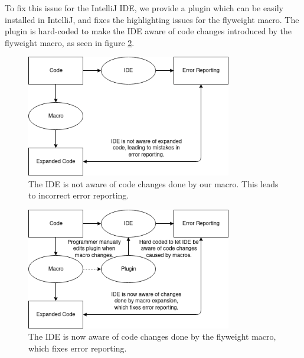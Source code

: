 \documentclass[11pt]{article}
\begin{document}
    To fix this issue for the IntelliJ IDE,
    we provide a plugin which
    can be easily installed in IntelliJ, and fixes the highlighting
    issues for the flyweight macro. The plugin is hard-coded to
    make the IDE aware of code changes introduced by the flyweight
    macro, as seen in figure \ref{fig:ide-fixed}.
    
    \begin{figure}[H]
        \begin{center}
            \includegraphics[width=0.8\textwidth]{ide-problem.png}
            \caption{The IDE is not aware of code changes done by our macro. This leads to incorrect error reporting.}
            \label{fig:ide-problem}
        \end{center}   
    \end{figure}

    \begin{figure}[H]
        \begin{center}
            \includegraphics[width=0.8\textwidth]{ide-fixed.png}
            \caption{The IDE is now aware of code changes done by the flyweight macro, which fixes error reporting.}
            \label{fig:ide-fixed}
        \end{center}   
    \end{figure}
\end{document}
